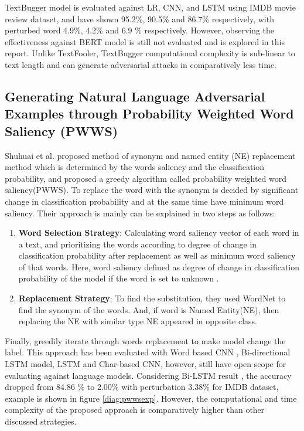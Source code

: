 \documentclass[%
	BCOR=8mm, %
	DIV=12, 
	toc=bibliography, %
	toc=listof, %
	oneside, %
	egregdoesnotlikesansseriftitles, %
	]{scrbook}
\begin{document}
 TextBugger model is evaluated against LR, CNN, and LSTM  using IMDB movie review dataset, and have shown 95.2\%, 90.5\% and 86.7\% respectively, with perturbed word 
 4.9\%, 4.2\% and 6.9 \% respectively. However, observing the effectiveness against BERT model is still not evaluated and is explored in this report. 
 Unlike TextFooler, TextBugger computational complexity is sub-linear to text length and can generate adversarial attacks in comparatively less time. 
 

\subsection{Generating Natural Language Adversarial Examples through Probability Weighted Word Saliency (PWWS)}

Shuhuai et al$.$\cite{ren_generating_2019} proposed method of synonym and named entity (NE) replacement method which is determined by the words saliency  and the 
classification probability, and proposed a greedy algorithm called probability weighted word saliency(PWWS). To replace the word with the synonym is decided by significant 
change in classification probability and at the same time have minimum word saliency. Their approach is mainly can be explained in two steps as follows:

\begin{enumerate}
\item \textbf{Word Selection Strategy}: Calculating word saliency vector of each word in a text, and prioritizing the words according to degree of change in classification probability
 after replacement as well as minimum word saliency of that words. Here, word saliency defined as degree of change in classification probability of the model if the word is set to
 unknown \cite{li_understanding_2017}.
\item \textbf{Replacement Strategy}: To find the substitution, they used WordNet to find the synonym of the words.  And, if word is Named Entity(NE), then  replacing the 
NE with similar type NE appeared in opposite class. 
\end{enumerate}

Finally, greedily iterate through words replacement to make model change the label. This approach has been evaluated with Word based CNN \cite{kim_convolutional_2014},  
Bi-directional LSTM model, LSTM and Char-based CNN\cite{zhang_character-level_2016}, however, still have open scope for evaluating against language models. Considering 
Bi-LSTM result , the accuracy dropped from 84.86 \% to 2.00\%   with perturbation 3.38\% for IMDB dataset, example is shown in figure \ref{diag:pwwsexp}. However, the 
computational and time complexity of the proposed approach is comparatively higher than other discussed strategies.
\end{document}
